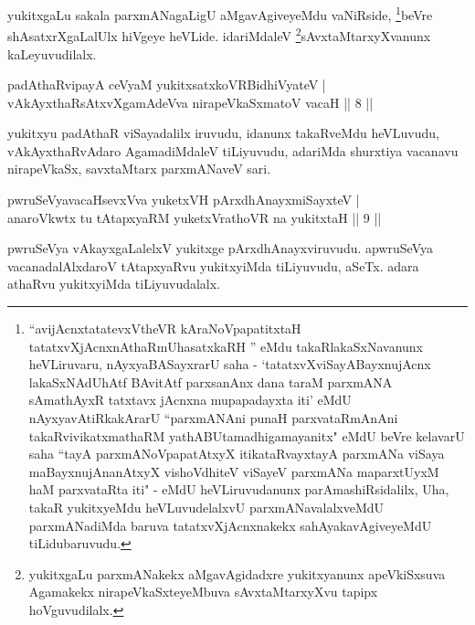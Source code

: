 \begin{artha}
yukitxgaLu sakala parxmANagaLigU aMgavAgiveyeMdu vaNiRside, \footnote{``avijAcnxtatatevxV\s theVR kAraNoVpapatitxtaH tatatxvXjAcnxnAthaRmUhasatxkaRH '' eMdu takaRlakaSxNavanunx heVLiruvaru, nAyxyaBASayxrarU saha - `tatatxvXviSayABayxnujAcnx lakaSxNAdUhAtf BAvitAtf parxsanAnx dana taraM parxmANA sAmathAyxR tatxtavx jAcnxna mupapadayxta iti' eMdU nAyxyavAtiRkakArarU ``parxmANAni punaH parxvataRmAnAni takaRvivikatxmathaRM yathABUtamadhigamayanitx" eMdU beVre kelavarU saha ``tayA parxmANoVpapatAtxyX itikataRvayxtayA parxmANa viSaya maBayxnujAnanAtxyX vishoVdhiteV viSayeV parxmANa maparxtUyxM haM parxvataRta iti" - eMdU heVLiruvudanunx parAmashiRsidalilx, Uha, takaR yukitxyeMdu heVLuvudelalxvU parxmANavalalxveMdU parxmANadiMda baruva tatatxvXjAcnxnakekx sahAyakavAgiveyeMdU tiLidubaruvudu.}beVre shAsatxrXgaLalUlx hiVgeye heVLide. idariMdaleV \footnote{yukitxgaLu parxmANakekx aMgavAgidadxre yukitxyanunx apeVkiSxsuva Agamakekx nirapeVkaSxteyeMbuva sAvxtaMtarxyXvu tapipx hoVguvudilalx.}sAvxtaMtarxyXvanunx kaLeyuvudilalx.
\end{artha}



\begin{shl}
padAthaRvipayA ceVyaM yukitxsatxkoVR\s BidhiVyateV |\\
vAkAyxthaRsAtxvXgamAdeVva nirapeVkaSxmatoV vacaH \hfill || 8 ||
\end{shl}

\begin{artha}
yukitxyu padAthaR viSayadalilx iruvudu, idanunx takaRveMdu heVLuvudu, vAkAyxthaRvAdaro AgamadiMdaleV tiLiyuvudu, adariMda shurxtiya vacanavu nirapeVkaSx, savxtaMtarx parxmANaveV sari.
\end{artha}


\begin{shl}
pwruSeVyavacaHsevxVva yuketxVH pArxdhAnayxmiSayxteV |\\
anaroVkwtx tu tAtapxyaRM yuketxVrathoVR na yukitxtaH \hfill || 9 ||
\end{shl}

\begin{artha}
pwruSeVya vAkayxgaLalelxV yukitxge pArxdhAnayxviruvudu. apwruSeVya vacanadalAlxdaroV tAtapxyaRvu yukitxyiMda tiLiyuvudu, aSeTx. adara athaRvu yukitxyiMda tiLiyuvudalalx.
\end{artha}

